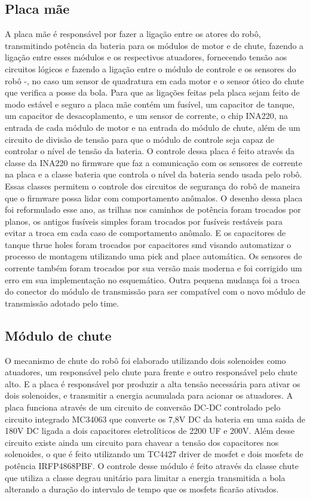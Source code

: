 \documentclass[letterpaper, 10 pt, conference]{ieeeconf}  %
\begin{document}
\subsection{Placa mãe}

A placa mãe é responsável por fazer a ligação entre os atores do robô, transmitindo potência da bateria para os módulos de motor e de chute, fazendo a ligação entre esses módulos e os respectivos atuadores, fornecendo tensão aos circuitos lógicos e fazendo a ligação entre o módulo de controle e os sensores do robô -, no caso um sensor de quadratura em cada motor e o sensor ótico do chute que verifica a posse da bola. 
Para que as ligações feitas pela placa sejam feito de modo estável e seguro a placa mãe contém um fusível, um capacitor de tanque, um capacitor de desacoplamento, e um sensor de corrente, o chip INA220, na entrada de cada módulo de motor e na entrada do módulo de chute, além de um circuito de divisão de tensão para que o módulo de controle seja capaz de controlar o nível de tensão da bateria.
O controle dessa placa é feito através da classe da INA220 no firmware que faz a comunicação com os sensores de corrente na placa e a classe bateria que controla o nível da bateria sendo usada pelo robô. Essas classes permitem o controle dos circuitos de segurança do robô de maneira que o firmware possa lidar com comportamento anômalos.
O desenho dessa placa foi reformulado esse ano, as trilhas nos caminhos de potência foram trocados por planos, os antigos fusíveis simples foram trocados por fusíveis restáveis para evitar a troca em cada caso de comportamento anômalo. E os capacitores de tanque thrue holes foram trocados por capacitores smd visando automatizar o processo de montagem utilizando uma pick and place automática.
Os sensores de corrente também foram trocados por sua versão mais moderna e foi corrigido um erro em sua implementação no esquemático. Outra pequena mudança foi a troca do conector do módulo de transmissão para ser compatível com o novo módulo de transmissão adotado pelo time.

\subsection{Módulo de chute}

O mecanismo de chute do robô foi elaborado utilizando dois solenoides como atuadores, um responsável pelo chute para frente e outro responsável pelo chute alto. E a placa é responsável por produzir a alta tensão necessária para ativar os dois solenoides, e transmitir a energia acumulada para acionar os atuadores.
A placa funciona através de um circuito de conversão DC-DC controlado pelo circuito integrado MC34063 que converte os 7,8V DC da bateria em uma saida de 180V DC ligada a dois capacitores eletrolíticos de 2200 UF e 200V. Além desse circuito existe ainda um circuito para chavear a tensão dos capacitores nos solenoides, o que é feito utilizando um TC4427 driver de mosfet e dois mosfets de potência IRFP4868PBF. 
O controle desse módulo é feito através da classe chute que utiliza a classe degrau unitário para limitar a energia transmitida a bola alterando a duração do intervalo de tempo que os mosfets ficarão ativados.
\end{document}
